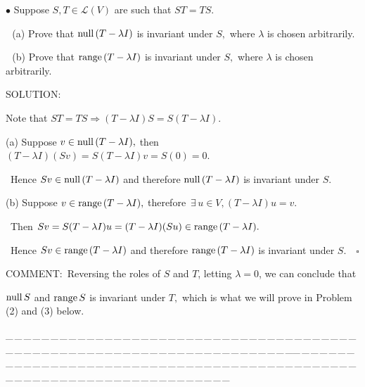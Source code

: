 \documentclass[a4paper, 11pt, UTF8]{article}
\def\range{\textup{range}\,}
\def\null{\textup{null\,}}
\def\Lm{\mathcal{L}}
\begin{document}
\begin{large}
{\small $\bullet$} {\timessl\Large
Suppose $S,T\in\Lm(V)$ are such that $ST=TS.$ 
}\par\,\,
(a) {\timessl\Large Prove that $\null(T-\lambda I)$ is invariant under $S,$ where $\lambda$ is chosen arbitrarily.
}\par\,\,
(b) {\timessl\Large Prove that $\range(T-\lambda I)$ is invariant under $S,$ where $\lambda$ is chosen arbitrarily.}\par
{\timesbf S\footnotesize{OLUTION:}}\par\quad
Note that $ST=TS\Rightarrow (T-\lambda I)S=S(T-\lambda I).$\par\quad
(a) Suppose $v\in\null(T-\lambda I),$ then $(T-\lambda I)(Sv)=S(T-\lambda I)v=S(0)=0.$\par\qquad\,
Hence $Sv\in\null(T-\lambda I)$ and therefore $\null(T-\lambda I)$ is invariant under $S.$\par\quad
(b) Suppose $v\in\range(T-\lambda I),$ therefore $\,\exists\,u\in V,(T-\lambda I)u=v.$\par\qquad\,
Then $ Sv=S(T-\lambda I)u=(T-\lambda I)(Su)\in\range(T-\lambda I).$\par\qquad\,
Hence $Sv\in\range(T-\lambda I)$ and therefore $\range(T-\lambda I)$ is invariant under $S.\quad\square$\par\quad
C{\small OMMENT:}\, Reversing the roles of $S$ and $T$, letting $\lambda=0$, we can conclude that\par\qquad\qquad\qquad
$\null S$ and $\range S$ is invariant under $T,$ which is what we will prove in Problem (2) and (3) below.\par
{\tiny \_\,\_\,\_\,\_\,\_\,\_\,\_\,\_\,\_\,\_\,\_\,\_\,\_\,\_\,\_\,\_\,\_\,\_\,\_\,\_\,\_\,\_\,\_\,\_\,\_\,\_\,\_\,\_\,\_\,\_\,\_\,\_\,\_\,\_\,\_\,\_\,\_\,\_\,\_\,\_\,\_\,\_\,\_\,\_\,\_\,\_\,\_\,\_\,\_\,\_\,\_\,\_\,\_\,\_\,\_\,\_\,\_\,\_\,\_\,\_\,\_\,\_\,\_\,\_\,\_\,\_\,\_\,\_\,\_\,\_\,\_\_\,\_\,\_\,\_\,\_\,\_\,\_\,\_\,\_\,\_\,\_\,\_\,\_\,\_\,\_\,\_\,\_\,\_\,\_\,\_\,\_\,\_\,\_\,\_\,\_\,\_\,\_\,\_\,\_\,\_\,\_\,\_\,\_\,\_\,\_\,\_\,\_\,\_\,\_\,\_\,\_\,\_\,\_\,\_\,\_\,\_\,\_\,\_\,\_\,\_\,\_\,\_\,\_\,\_\,\_\,\_\,\_\,\_\,\_\,\_\,\_\,\_\,\_\,\_\,\_\,\_\,\_\,\_\,\_\,\_\,\_}\par


\end{large}
\end{document}
